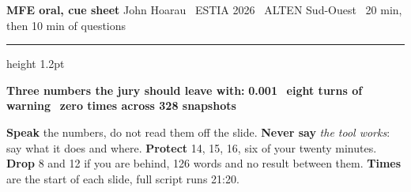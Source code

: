 \documentclass[a4paper,8pt]{extarticle}
\newcommand{\band}[1]{%
  \par\noindent\colorbox{altenBlueBg}{%
  \parbox{\dimexpr\linewidth-2\fboxsep\relax}{\vspace{3pt}#1\vspace{3pt}}}\par}
\newcommand{\scene}[1]{{\bfseries\color{altenAzureDark}#1}}
\newcommand{\dd}{\textperiodcentered\ }
\begin{document}
{\noindent\Large\bfseries\color{altenNavy}MFE oral, cue sheet}\hfill
{\color{altenAzureDark}John Hoarau \dd ESTIA 2026 \dd ALTEN Sud-Ouest \dd 20 min, then 10 min of questions}

\vspace{2pt}
{\color{altenGrey}\hrule height 1.2pt}
\vspace{4pt}

\band{%
{\bfseries\color{altenNavy}Three numbers the jury should leave with:}\quad
{\bfseries\color{altenAzure}0.001}\quad\dd\quad
{\bfseries\color{altenAzure}eight turns of warning}\quad\dd\quad
{\bfseries\color{altenAzure}zero times across 328 snapshots}
\par\vspace{3pt}
\scene{Speak} the numbers, do not read them off the slide. \scene{Never say} \emph{the tool works}: say what it does and where.
\scene{Protect} 14, 15, 16, six of your twenty minutes. \scene{Drop} 8 and 12 if you are behind, 126 words and no result between them.
\scene{Times} are the start of each slide, full script runs 21:20.}
\end{document}
